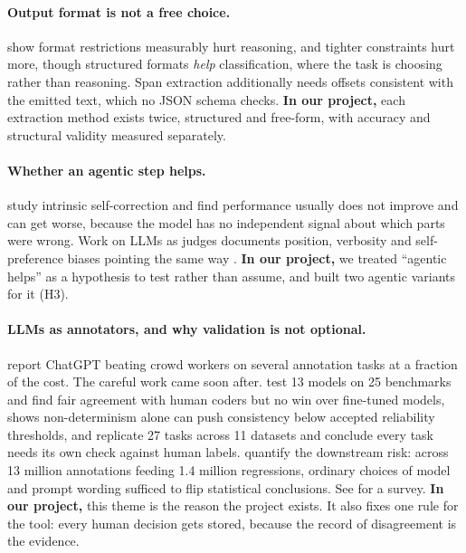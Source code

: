 \paragraph{Output format is not a free choice.}
\citet{tam2024speak} show format restrictions measurably hurt reasoning, and
tighter constraints hurt more, though structured formats \emph{help}
classification, where the task is choosing rather than reasoning. Span
extraction additionally needs offsets consistent with the emitted text, which
no JSON schema checks.
\textbf{In our project,} each extraction method exists twice, structured and
free-form, with accuracy and structural validity measured separately.

\paragraph{Whether an agentic step helps.}
\citet{huang2024selfcorrect} study intrinsic self-correction and find
performance usually does not improve and can get worse, because the model has
no independent signal about which parts were wrong. Work on LLMs as judges
documents position, verbosity and self-preference biases pointing the same way
\citep{zheng2023judging}.
\textbf{In our project,} we treated ``agentic helps'' as a hypothesis to test
rather than assume, and built two agentic variants for it (H3).

\paragraph{LLMs as annotators, and why validation is not optional.}
\citet{gilardi2023chatgpt} report ChatGPT beating crowd workers on several
annotation tasks at a fraction of the cost. The careful work came soon after.
\citet{ziems2024transform} test 13 models on 25 benchmarks and find fair
agreement with human coders but no win over fine-tuned models,
\citet{reiss2023testing} shows non-determinism alone can push consistency below
accepted reliability thresholds, and \citet{pangakis2023validation} replicate
27 tasks across 11 datasets and conclude every task needs its own check against
human labels. \citet{baumann2025hacking} quantify the downstream risk: across
13 million annotations feeding 1.4 million regressions, ordinary choices of
model and prompt wording sufficed to flip statistical conclusions. See
\citet{tan2024annotation} for a survey.
\textbf{In our project,} this theme is the reason the project exists. It also
fixes one rule for the tool: every human decision gets stored, because the
record of disagreement is the evidence.

